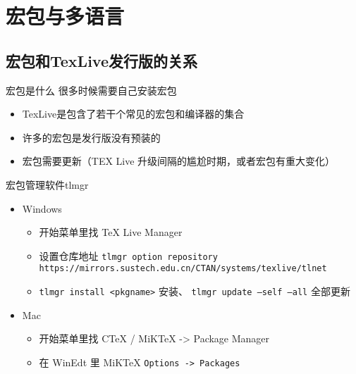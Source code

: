 \section{宏包与多语言}
\subsection{宏包和TexLive发行版的关系}
\begin{frame}{宏包是什么}
    很多时候需要自己安装宏包
    \begin{itemize}
        \item TexLive是包含了若干个常见的宏包和编译器的集合
        \item 许多的宏包是发行版没有预装的
        \item 宏包需要更新（TEX Live 升级间隔的尴尬时期，或者宏包有重大变化）
    \end{itemize}
    宏包管理软件tlmgr
    \begin{itemize}
        \item<+-> Windows
            \begin{itemize}
              \item 开始菜单里找 TeX Live Manager
              \item 设置仓库地址 \texttt{tlmgr option repository https://mirrors.sustech.edu.cn/CTAN/systems/texlive/tlnet}
              \item \texttt{tlmgr install <pkgname>} 安装、 \texttt{tlmgr update --self --all} 全部更新
            \end{itemize}
        \item<+-> Mac
          \begin{itemize}
              \item 开始菜单里找 CTeX / MiKTeX -> Package Manager
              \item 在 WinEdt 里 MiKTeX \texttt{Options -> Packages}
        \end{itemize}
        
    \end{itemize}

    

    \vspace{0.4cm} %
\end{frame}

